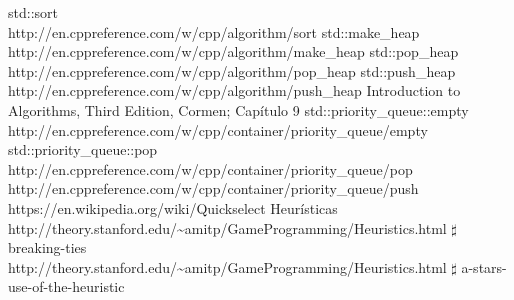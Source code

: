 \newpage

\renewcommand\refname{Referencias}
\begin{thebibliography}{X}
 std::sort\\ http://en.cppreference.com/w/cpp/algorithm/sort
 std::make\_heap\\http://en.cppreference.com/w/cpp/algorithm/make\_heap
 std::pop\_heap\\ http://en.cppreference.com/w/cpp/algorithm/pop\_heap
 std::push\_heap\\http://en.cppreference.com/w/cpp/algorithm/push\_heap
 Introduction to Algorithms, Third Edition, Cormen; Capítulo 9
 std::priority\_queue::empty\\
http://en.cppreference.com/w/cpp/container/priority\_queue/empty
 std::priority\_queue::pop\\ http://en.cppreference.com/w/cpp/container/priority\_queue/pop
 \\ http://en.cppreference.com/w/cpp/container/priority\_queue/push 
 \\ https://en.wikipedia.org/wiki/Quickselect
 Heurísticas \\
http://theory.stanford.edu/\textasciitilde amitp/GameProgramming/Heuristics.html $\sharp$ breaking-ties\\
http://theory.stanford.edu/\textasciitilde amitp/GameProgramming/Heuristics.html $\sharp$ a-stars-use-of-the-heuristic
\end{thebibliography}
\newpage

